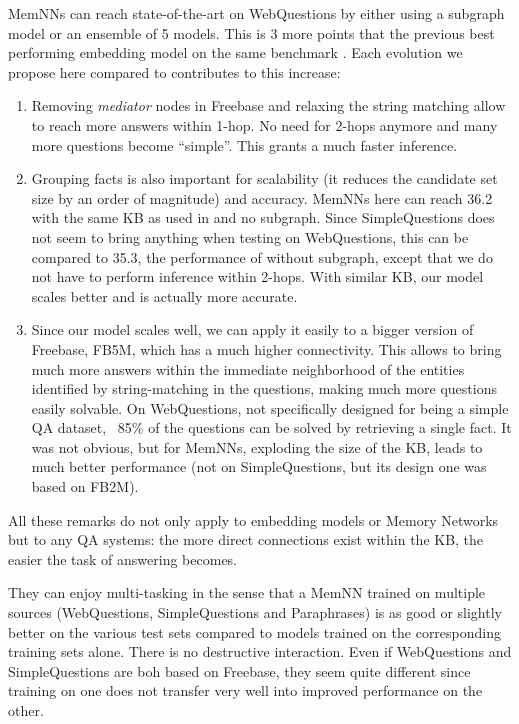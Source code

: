 \documentclass[11pt,a4paper]{article}
\newcommand{\fb}{{\sf Freebase}\xspace}
\newcommand{\wq}{{\sf WebQuestions}\xspace}
\newcommand{\fbq}{{\sf SimpleQuestions}\xspace}
\newcommand{\fbs}{{\sf FB2M}\xspace}
\newcommand{\fbb}{{\sf FB5M}\xspace}
\newcommand{\prp}{{\sf Paraphrases}\xspace}
\begin{document}
MemNNs can reach state-of-the-art on \wq by either using a
  subgraph model or an ensemble of 5 models. This is 3 more points
  that the previous best performing embedding model on the same
  benchmark \cite{bordes-chopra-weston:2014:EMNLP2014}.
Each evolution we propose here compared to
  \cite{bordes-chopra-weston:2014:EMNLP2014} contributes to this
  increase:
\begin{enumerate}
\item
  Removing {\it mediator} nodes in \fb and relaxing the string
  matching allow to reach more answers within 1-hop. No need for
  2-hops anymore and many more questions become ``simple''. This grants a
  much faster inference.
\item
  Grouping facts is also important for scalability (it reduces
  the candidate set size by an order of magnitude) and
  accuracy. MemNNs here can reach 36.2 with the same KB as used in
  \cite{bordes-chopra-weston:2014:EMNLP2014} and no subgraph. Since
  \fbq does not seem to bring anything when testing on \wq, this can
  be compared to 35.3, the performance of
  \cite{bordes-chopra-weston:2014:EMNLP2014} without subgraph, except
  that we do not have to perform inference within 2-hops. With similar
  KB, our model scales better and is actually more accurate.
\item
  Since our model scales well, we can apply it easily to a bigger
  version of \fb, \fbb, which has a much higher connectivity. This
  allows to bring much more answers within the immediate neighborhood
  of the entities identified by string-matching in the questions,
  making much more questions easily solvable. On \wq, not specifically
  designed for being a simple QA dataset, ~85\% of the questions can
  be solved by retrieving a single fact.
It was not obvious, but for MemNNs, exploding the size of the KB,
  leads to much better performance (not on \fbq, but its design
  one was based on \fbs).
\end{enumerate}
All these remarks do not only apply to embedding models or Memory
Networks but to any QA systems: the more direct connections exist
within the KB, the easier the task of answering becomes.


They can enjoy multi-tasking in the sense that a MemNN trained
  on multiple sources (\wq, \fbq and \prp) is as good or slightly
  better on the various test sets compared to models trained on the
  corresponding training sets alone. There is no destructive
  interaction.
Even if \wq and \fbq are boh based on \fb, they seem quite
  different since training on one does not transfer very well into
  improved performance on the other.
\end{document}
